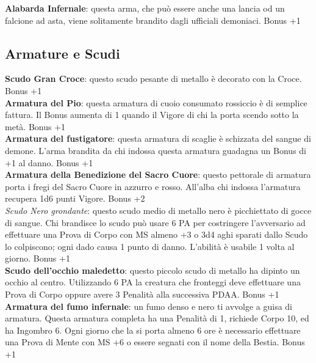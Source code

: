 \documentclass[a4paper,twoside,openany]{book}
\begin{document}
\begin{multicols}{2}
\textbf{Alabarda Infernale}: questa arma, che può essere anche una lancia od un falcione ad asta, viene solitamente brandito dagli ufficiali demoniaci. Bonus +1

\subsection{Armature e Scudi}

\textbf{Scudo Gran Croce}: questo scudo pesante di metallo è decorato con la Croce. Bonus +1\\

\textbf{Armatura del Pio}: questa armatura di cuoio consumato rossiccio è di semplice fattura. Il Bonus aumenta di 1 quando il Vigore di chi la porta scendo sotto la metà. Bonus +1\\

\textbf{Armatura del fustigatore}: questa armatura di scaglie è schizzata del sangue di demone. L'arma brandita da chi indossa questa armatura guadagna un Bonus di +1 al danno. Bonus +1\\

\textbf{Armatura della Benedizione del Sacro Cuore}: questo pettorale di armatura porta i fregi del Sacro Cuore in azzurro e rosso. All'alba chi indossa l'armatura recupera 1d6 punti Vigore. Bonus +2\\

\textit{Scudo Nero grondante}: questo scudo medio di metallo nero è picchiettato di gocce di sangue. Chi brandisce lo scudo può usare 6 PA per costringere l'avversario ad effettuare una Prova di Corpo con MS almeno +3 o 3d4 aghi sparati dallo Scudo lo colpiscono; ogni dado causa 1 punto di danno. L'abilità è usabile 1 volta al giorno. Bonus +1\\

\textbf{Scudo dell'occhio maledetto}: questo piccolo scudo di metallo ha dipinto un occhio al centro. Utilizzando 6 PA la creatura che fronteggi deve effettuare una Prova di Corpo oppure avere 3 Penalità alla successiva PDAA. Bonus +1\\

\textbf{Armatura del fumo infernale}: un fumo denso e nero ti avvolge a guisa di armatura. Questa armatura completa ha una Penalità di 1, richiede Corpo 10, ed ha Ingombro 6. Ogni giorno che la si porta almeno 6 ore è necessario effettuare una Prova di Mente con MS +6 o essere segnati con il nome della Bestia. Bonus +1


\end{multicols}
\end{document}
